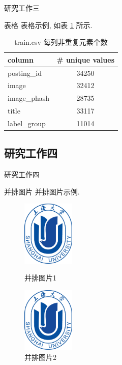\documentclass[9pt]{ctexbeamer}
\begin{document}
\begin{frame}{研究工作三}
  \begin{block}{表格}
    表格示例, 如表 \ref{tab:unique_values} 所示. 

    \begin{table}[htbp]
      \small
      \centering
      \caption{train.csv 每列非重复元素个数}
      \label{tab:unique_values}
      \begin{tabular}{lc}
        \toprule
        column & \# unique values \\
        \midrule
        posting\_id & 34250 \\
        image & 32412 \\
        image\_phash & 28735 \\
        title & 33117 \\
        label\_group & 11014 \\
        \bottomrule
      \end{tabular}
    \end{table}
  \end{block}
\end{frame}

\subsection{研究工作四}

\begin{frame}{研究工作四}
  \begin{block}{并排图片}
    并排图片示例.
  \end{block}
  \begin{figure}[htbp]
    \centering
    \begin{minipage}[t]{0.48\textwidth}
      \centering
      \includegraphics[width=2.5cm]{SHU-blue.pdf}
      \caption{并排图片1}
      \label{fig:left_side}
    \end{minipage}
    \begin{minipage}[t]{0.48\textwidth}
      \centering
      \includegraphics[width=2.5cm]{SHU-blue.pdf}
      \caption{并排图片2}
      \label{fig:right_side}
    \end{minipage}
  \end{figure}
\end{frame}
\end{document}
